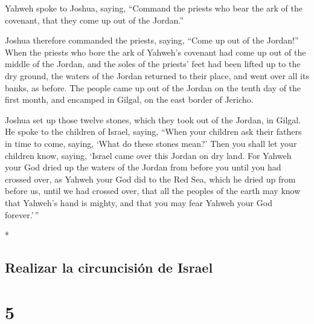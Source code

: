 \begin{paracol}{2}
\begin{otherlanguage}{english}
 Yahweh spoke to Joshua, saying, 
``Command the priests who bear the ark of the covenant, that they come
up out of the Jordan.''

 Joshua therefore commanded the priests, saying, ``Come
up out of the Jordan!''  When the priests who bore the
ark of Yahweh's covenant had come up out of the middle of the Jordan,
and the soles of the priests' feet had been lifted up to the dry ground,
the waters of the Jordan returned to their place, and went over all its
banks, as before.  The people came up out of the Jordan
on the tenth day of the first month, and encamped in Gilgal, on the east
border of Jericho.

 Joshua set up those twelve stones, which they took out
of the Jordan, in Gilgal.  He spoke to the children of
Israel, saying, ``When your children ask their fathers in time to come,
saying, `What do these stones mean?'  Then you shall let
your children know, saying, `Israel came over this Jordan on dry land.
 For Yahweh your God dried up the waters of the Jordan
from before you until you had crossed over, as Yahweh your God did to
the Red Sea, which he dried up from before us, until we had crossed
over,  that all the peoples of the earth may know that
Yahweh's hand is mighty, and that you may fear Yahweh your God
forever.'\,''

\end{otherlanguage}

\switchcolumn[0]*

\hypertarget{realizar-la-circuncisiuxf3n-de-israel}{%
\subsection{Realizar la circuncisión de
Israel}\label{realizar-la-circuncisiuxf3n-de-israel}}

\hypertarget{section-8}{%
\section{5}\label{section-8}}


\end{paracol}
